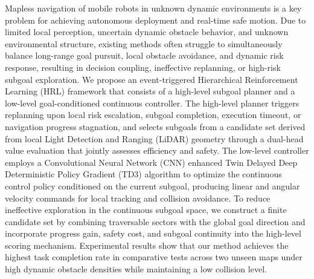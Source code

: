 
Mapless navigation of mobile robots in unknown dynamic environments is a key problem for achieving autonomous deployment and real-time safe motion. Due to limited local perception, uncertain dynamic obstacle behavior, and unknown environmental structure, existing methods often struggle to simultaneously balance long-range goal pursuit, local obstacle avoidance, and dynamic risk response, resulting in decision coupling, ineffective replanning, or high-risk subgoal exploration. We propose an event-triggered Hierarchical Reinforcement Learning (HRL) framework that consists of a high-level subgoal planner and a low-level goal-conditioned continuous controller. The high-level planner triggers replanning upon local risk escalation, subgoal completion, execution timeout, or navigation progress stagnation, and selects subgoals from a candidate set derived from local Light Detection and Ranging (LiDAR) geometry through a dual-head value evaluation that jointly assesses efficiency and safety. The low-level controller employs a Convolutional Neural Network (CNN) enhanced Twin Delayed Deep Deterministic Policy Gradient (TD3) algorithm to optimize the continuous control policy conditioned on the current subgoal, producing linear and angular velocity commands for local tracking and collision avoidance. To reduce ineffective exploration in the continuous subgoal space, we construct a finite candidate set by combining traversable sectors with the global goal direction and incorporate progress gain, safety cost, and subgoal continuity into the high-level scoring mechanism. Experimental results show that our method achieves the highest task completion rate in comparative tests across two unseen maps under high dynamic obstacle densities while maintaining a low collision level.


